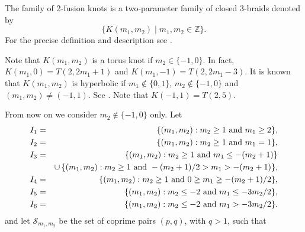 \documentclass[11pt]{amsart}
\numberwithin{equation}{section}
\theoremstyle{plain}
\theoremstyle{definition}
\newcommand{\ZZ}{{\mathbb{Z}}}
\def\CS{\mathcal S}
\begin{document}
The family of 2-fusion knots is a two-parameter family  of closed 3-braids denoted
by
$$\{ K(m_1, m_2)  \mid  m_1, m_2\in \ZZ\}.$$
For the precise definition and description see \cite {GV, DG}. 

Note that $K(m_1, m_2)$ is a torus knot if $m_2 \in \{-1,0\}$. In fact, $K(m_1, 0) = T(2, 2m_1 + 1)$ and $K(m_1, -1) = T(2, 2m_1 -3)$. It is known that $K(m_1, m_2)$ is hyperbolic if $m_1 \notin \{0, 1\}$, $m_2 \notin \{-1,0\}$ and $(m_1, m_2) \not= (-1,1)$. See \cite{GV}. Note that $K(-1,1) = T(2,5)$.

From now on we consider $m_2 \notin \{-1,0\}$ only. Let 
\begin{eqnarray*}
I_1 &=& \{(m_1, m_2) : m_2 \ge 1 \text{ and } m_1 \ge 2\}, \smallskip \\
I_2 &=& \{(m_1, m_2) : m_2 \ge 1 \text{ and } m_1 = 1\}, \smallskip \\
I_3 &=& \{(m_1, m_2) : m_2 \ge 1 \text{ and } m_1  \le -(m_2 + 1)\} \\
&& \cup \, \{(m_1, m_2) : m_2 \ge 1 \text{ and } -(m_2 + 1)/2 > m_1 > -(m_2 + 1)\},\smallskip\\
I_4 &=& \{(m_1, m_2) : m_2 \ge 1 \text{ and } 0 \ge m_1 \ge - (m_2 + 1)/2\}, \smallskip\\
I_5 &=& \{(m_1, m_2) : m_2 \le -2 \text{ and }  m_1 \le -3m_2/2\}, \smallskip\\
I_6 &=& \{(m_1, m_2) : m_2 \le -2 \text{ and } m_1 > -3m_2/2\}.
\end{eqnarray*}
and let $\CS_{m_1, m_2}$ be the set of coprime pairs $(p,q)$, with $q>1$, such that
\end{document}
